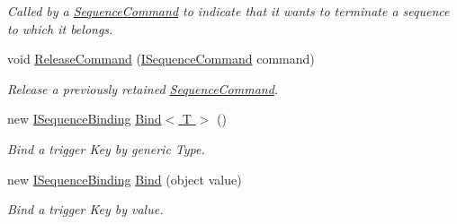 \begin{DoxyCompactItemize}
\begin{DoxyCompactList}\small\item\em Called by a \hyperlink{classstrange_1_1extensions_1_1sequencer_1_1impl_1_1_sequence_command}{Sequence\-Command} to indicate that it wants to terminate a sequence to which it belongs. \end{DoxyCompactList}\item 
void \hyperlink{classstrange_1_1extensions_1_1sequencer_1_1impl_1_1_sequencer_a3bd35c4eb952086f159831612b13ce74}{Release\-Command} (\hyperlink{interfacestrange_1_1extensions_1_1sequencer_1_1api_1_1_i_sequence_command}{I\-Sequence\-Command} command)
\begin{DoxyCompactList}\small\item\em Release a previously retained \hyperlink{classstrange_1_1extensions_1_1sequencer_1_1impl_1_1_sequence_command}{Sequence\-Command}. \end{DoxyCompactList}\item 
\hypertarget{classstrange_1_1extensions_1_1sequencer_1_1impl_1_1_sequencer_ad34eb02c5e94ef8e37a7244b9f9aa055}{new \hyperlink{interfacestrange_1_1extensions_1_1sequencer_1_1api_1_1_i_sequence_binding}{I\-Sequence\-Binding} \hyperlink{classstrange_1_1extensions_1_1sequencer_1_1impl_1_1_sequencer_ad34eb02c5e94ef8e37a7244b9f9aa055}{Bind$<$ T $>$} ()}\label{classstrange_1_1extensions_1_1sequencer_1_1impl_1_1_sequencer_ad34eb02c5e94ef8e37a7244b9f9aa055}

\begin{DoxyCompactList}\small\item\em Bind a trigger Key by generic Type. \end{DoxyCompactList}\item 
\hypertarget{classstrange_1_1extensions_1_1sequencer_1_1impl_1_1_sequencer_ab331ac7c7d1b279894f35edf8927a235}{new \hyperlink{interfacestrange_1_1extensions_1_1sequencer_1_1api_1_1_i_sequence_binding}{I\-Sequence\-Binding} \hyperlink{classstrange_1_1extensions_1_1sequencer_1_1impl_1_1_sequencer_ab331ac7c7d1b279894f35edf8927a235}{Bind} (object value)}\label{classstrange_1_1extensions_1_1sequencer_1_1impl_1_1_sequencer_ab331ac7c7d1b279894f35edf8927a235}

\begin{DoxyCompactList}\small\item\em Bind a trigger Key by value. \end{DoxyCompactList}\end{DoxyCompactItemize}
